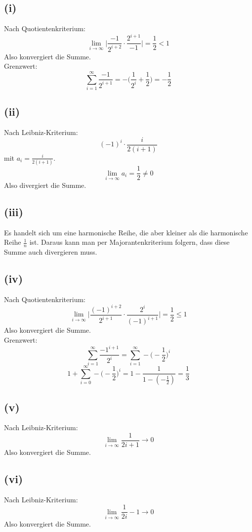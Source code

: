 \documentclass[a4paper]{scrartcl}
\begin{document}
\subsection{(i)}
Nach Quotientenkriterium:
\[ \lim_{i\to\infty} \bigg|\frac {-1} {2^{i+2}} \cdot \frac {2^{i+1}} {-1}\bigg| = \frac 1 2 < 1 \]
Also konvergiert die Summe. \\
Grenzwert: 
\[ \sum_{i=1}^\infty \frac {-1} {2^{i+1}} = - \Big(\frac 1 {2^i} + \frac 1 2 \Big) = - \frac 1 2 \]

\subsection{(ii)}
Nach Leibniz-Kriterium:
\[ (-1)^i \cdot \frac i {2(i+1)} \]
mit \(a_i = \frac i {2(i+1)} \).
\[ \lim_{i\to\infty} a_i = \frac 1 2 \neq 0 \]
Also divergiert die Summe.

\subsection{(iii)}
Es handelt sich um eine harmonische Reihe, die aber kleiner als die harmonische Reihe \( \frac 1 n \) ist. Daraus kann man per Majorantenkriterium folgern, dass diese Summe auch divergieren muss.

\subsection{(iv)}
Nach Quotientenkriterium:
\[ \lim_{i\to\infty} \bigg| \frac {(-1)^{i+2}} {2^{i+1}} \cdot \frac {2^i} {(-1)^{i+1}} \bigg| = \frac 1 2 \le 1 \]
Also konvergiert die Summe. \\
Grenzwert:
\[ \sum_{i=1}^\infty \frac {{-1}^{i+1}} {2^i} = \sum_{i=1}^\infty -\Big(-\frac 1 2\Big)^i \]
\[ 1+\sum_{i=0}^\infty -\Big(-\frac 1 2\Big)^i = 1 -\frac 1 {1-(-\frac 1 2)} = \frac 1 3 \]

\subsection{(v)}
Nach Leibniz-Kriterium:
\[ \lim_{i\to\infty} \frac 1 {2i+1} \rightarrow 0 \]
Also konvergiert die Summe.

\subsection{(vi)}
Nach Leibniz-Kriterium:
\[ \lim_{i\to\infty} \frac 1 {2i} - 1 \rightarrow 0 \]
Also konvergiert die Summe.
\end{document}
